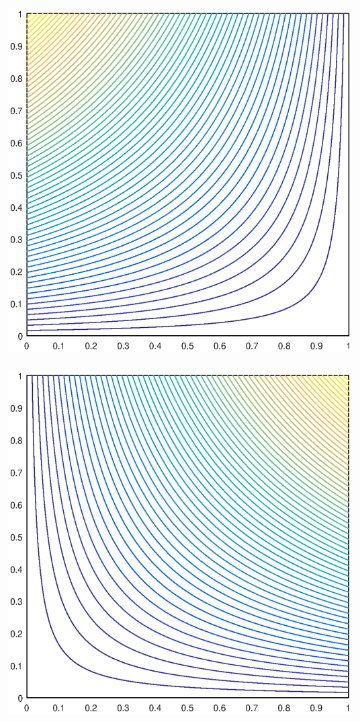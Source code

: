 \begin{figure}
\label{fig::2D_ME1_unit_square_basis_functions}
\centering
	\begin{subfigure}[b]{0.35\textwidth}
		\centering
		\includegraphics[width=\textwidth]{figures/sec_BF/square_MAXENT1_contour_b4.eps}
		\caption{}
	\end{subfigure}
	\hspace{1cm}
	\begin{subfigure}[b]{0.35\textwidth}
		\centering
		\includegraphics[width=\textwidth]{figures/sec_BF/square_MAXENT1_contour_b3.eps}

\end{subfigure}
\end{figure}
